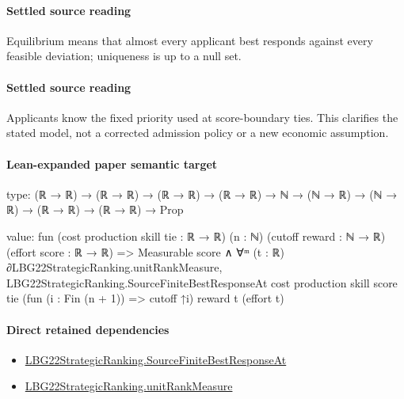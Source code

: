 \documentclass[10pt]{article}
\begin{document}
\paragraph{Settled source reading}
\begin{sloppypar}
Equilibrium means that almost every applicant best responds against every feasible deviation;\allowbreak{} uniqueness is up to a null set.\allowbreak{}
\end{sloppypar}
\paragraph{Settled source reading}
\begin{sloppypar}
Applicants know the fixed priority used at score-\allowbreak{}boundary ties.\allowbreak{} This clarifies the stated model, not a corrected admission policy or a new economic assumption.\allowbreak{}
\end{sloppypar}

\paragraph{Lean-expanded paper semantic target}
\begin{ReviewVerbatim}
type:
(ℝ → ℝ) → (ℝ → ℝ) → (ℝ → ℝ) → (ℝ → ℝ) → ℕ → (ℕ → ℝ) → (ℕ → ℝ) → (ℝ → ℝ) → (ℝ → ℝ) → Prop

value:
fun (cost production skill tie : ℝ → ℝ) (n : ℕ) (cutoff reward : ℕ → ℝ) (effort score : ℝ → ℝ) =>
  Measurable score ∧
    ∀ᵐ (t : ℝ) ∂LBG22StrategicRanking.unitRankMeasure,
      LBG22StrategicRanking.SourceFiniteBestResponseAt cost production skill score tie
        (fun (i : Fin (n + 1)) => cutoff ↑i) reward t (effort t)
\end{ReviewVerbatim}

\paragraph{Direct retained dependencies}
\begin{itemize}\raggedright
\item \hyperlink{paper-prerequisite-519e321cd0957049}{LBG22\allowbreak{}Strategic\allowbreak{}Ranking.\allowbreak{}Source\allowbreak{}Finite\allowbreak{}Best\allowbreak{}Response\allowbreak{}At}
\item \hyperlink{governing-declaration-678cf48d549cb620}{LBG22\allowbreak{}Strategic\allowbreak{}Ranking.\allowbreak{}unit\allowbreak{}Rank\allowbreak{}Measure}
\end{itemize}
\end{document}
